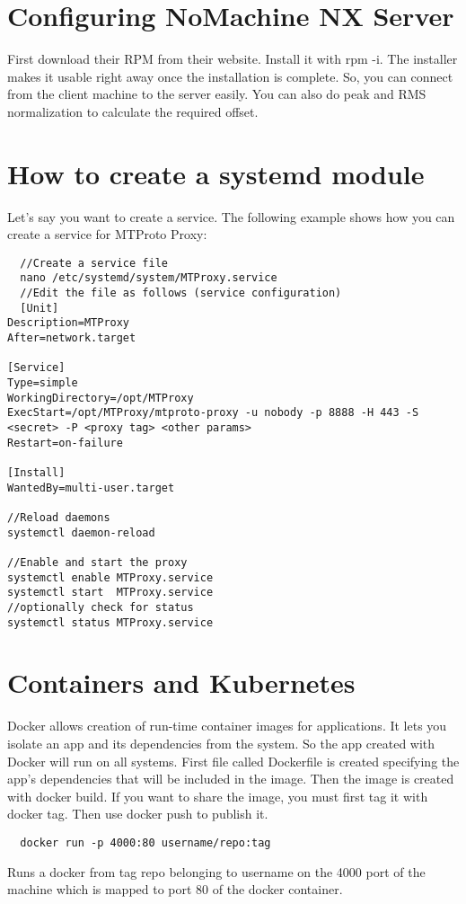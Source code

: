 \documentclass{article}
\begin{document}
\section{Configuring NoMachine NX Server}
First download their RPM from their website. Install it with rpm -i. The installer makes it usable right away once the installation is complete. So, you can connect from the client machine to the server easily.
You can also do peak and RMS normalization to calculate the required offset.

\section{How to create a systemd module}
Let's say you want to create a service. The following example shows how you can create a service for MTProto Proxy:
\begin{verbatim}
  //Create a service file
  nano /etc/systemd/system/MTProxy.service
  //Edit the file as follows (service configuration)
  [Unit]
Description=MTProxy
After=network.target

[Service]
Type=simple
WorkingDirectory=/opt/MTProxy
ExecStart=/opt/MTProxy/mtproto-proxy -u nobody -p 8888 -H 443 -S <secret> -P <proxy tag> <other params>
Restart=on-failure

[Install]
WantedBy=multi-user.target

//Reload daemons
systemctl daemon-reload

//Enable and start the proxy
systemctl enable MTProxy.service
systemctl start  MTProxy.service
//optionally check for status
systemctl status MTProxy.service
\end{verbatim}



\section{Containers and Kubernetes}
Docker allows creation of run-time container images for applications. It lets you isolate an app and its dependencies from the system. So the app created with Docker will run on all systems.
First file called Dockerfile is created specifying the app's dependencies that will be included in the image.
Then the image is created with docker build. If you want to share the image, you must first tag it with docker tag. Then use docker push to publish it.
\begin{verbatim}
  docker run -p 4000:80 username/repo:tag
\end{verbatim}
Runs a docker from tag repo belonging to username on the 4000 port of the machine which is mapped to port 80 of the docker container.
\end{document}
